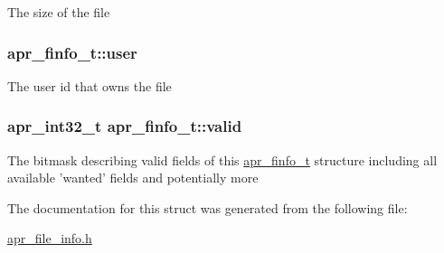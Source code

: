 The size of the file \hypertarget{structapr__finfo__t_ab79d14bd50f50662d29ad433166c4bc5}{
\subsubsection[{user}]{ apr\-\_\-finfo\-\_\-t\-::user}}\label{structapr__finfo__t_ab79d14bd50f50662d29ad433166c4bc5}
The user id that owns the file \hypertarget{structapr__finfo__t_aff0cdf06637edec63c4701e582792019}{
\subsubsection[{valid}]{\setlength{\rightskip}{0pt plus 5cm}apr\-\_\-int32\-\_\-t apr\-\_\-finfo\-\_\-t\-::valid}}\label{structapr__finfo__t_aff0cdf06637edec63c4701e582792019}
The bitmask describing valid fields of this \hyperlink{structapr__finfo__t}{apr\-\_\-finfo\-\_\-t} structure including all available 'wanted' fields and potentially more 

The documentation for this struct was generated from the following file\-:\begin{DoxyCompactItemize}
\item 
\hyperlink{apr__file__info_8h}{apr\-\_\-file\-\_\-info.\-h}\end{DoxyCompactItemize}
